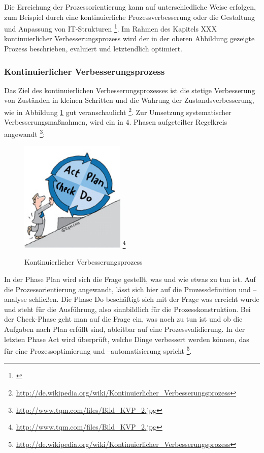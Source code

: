 \documentclass[a4paper, 12pt]{scrreprt}
\begin{document}
Die Erreichung der Prozessorientierung kann auf unterschiedliche Weise erfolgen, zum Beispiel durch eine kontinuierliche Prozessverbesserung oder die Gestaltung und Anpassung von IT-Strukturen \footnote{\url{}}. Im Rahmen des Kapitels XXX kontinuierlicher Verbesserungsprozess wird der in der oberen Abbildung gezeigte Prozess beschrieben, evaluiert und letztendlich optimiert.



\subsubsection{Kontinuierlicher Verbesserungsprozess}
Das Ziel des kontinuierlichen Verbesserungsprozesses ist die stetige Verbesserung von Zuständen in kleinen Schritten und die Wahrung der  Zustandsverbesserung, wie in Abbildung \ref{kvb} gut veranschaulicht \footnote{\url{http://de.wikipedia.org/wiki/Kontinuierlicher_Verbesserungsprozess}}. Zur Umsetzung systematischer Verbesserungsmaßnahmen, wird ein in 4. Phasen aufgeteilter Regelkreis angewandt \footnote{\url{http://www.tqm.com/files/Bild_KVP_2.jpg}}:
 
\begin{figure}[h!]
	\centering
	\includegraphics[width=5cm]{bilder_olli/kontinuierlicher_verbesserungsprozess} \footnote{\url{http://www.tqm.com/files/Bild_KVP_2.jpg}}
	\caption{Kontinuierlicher Verbesserungsprozess}
	\label{kvb}
\end{figure}


In der Phase Plan wird sich die Frage gestellt, was und wie etwas zu tun ist. Auf die Prozessorientierung angewandt, lässt sich hier auf die Prozessdefinition und –analyse schließen. Die Phase Do beschäftigt sich mit der Frage was erreicht wurde und steht für die Ausführung, also sinnbildlich für die Prozesskonstruktion. Bei der Check-Phase geht man auf die Frage ein, was noch zu tun ist und ob die Aufgaben nach Plan erfüllt sind, ableitbar auf eine Prozessvalidierung. In der letzten Phase Act wird überprüft, welche Dinge verbessert werden können, das für eine Prozessoptimierung und –automatisierung spricht \footnote{\url{http://de.wikipedia.org/wiki/Kontinuierlicher_Verbesserungsprozess}}.
\end{document}
